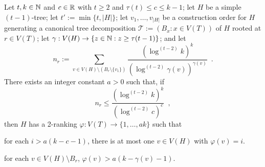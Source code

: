 \documentclass[kpfonts]{patmorin}
\theoremstyle{named}
\begin{document}
\begin{lem}\label{t-tree-no-slack}
    Let $t,k\in\mathbb{N}$ and $c\in\mathbb{R}$ with $t\ge 2$ and $\tau(t)\le c\le k-1$; let $H$ be a simple $(t-1)$-tree; let $t':=\min\{t, |H|\}$; let $v_1,\ldots,v_{|H|}$ be a construction order for $H$ generating a canonical tree decomposition $\mathcal{T}:=(B_x:x\in V(T))$ of $H$ rooted at $r\in V(T)$; let $\gamma:V(H)\to\{z\in\mathbb{N}: z\ge \tau(t-1)\}$; and let
    \[
        n_r:=\sum_{v\in V(H)\setminus (B_r\setminus\{v_1\})} \frac{\left(\log^{(t-2)} k\right)^k}{\left(\log^{(t-2)} \gamma(v)\right)^{\gamma(v)}} \enspace .
    \]
    There exists an integer constant $a>0$ such that,
    if
    \begin{equation}
         n_r \le \frac{(\log^{(t-2)} k)^k}{(\log^{(t-2)} c)^{c}} \enspace ,
     \label{total-weight-ii}
    \end{equation}
    then $H$ has a 2-ranking $\varphi:V(T)\to\{1,\ldots,ak\}$ such that
    \begin{compactenum}[(P1)]
        \item for each $i>a(k-c-1)$, there is at most one $v\in V(H)$ with $\varphi(v)=i$.
        \item for each $v\in V(H)\setminus B_r$, $\varphi(v)> a(k-\gamma(v)-1)$.
    \end{compactenum}
\end{lem}
\end{document}
